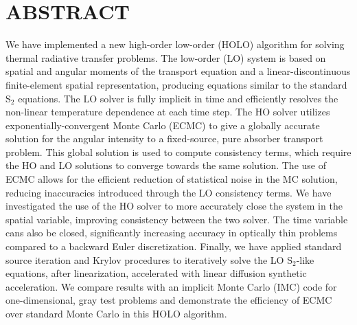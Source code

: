 %
%
%

\chapter*{ABSTRACT}

\pagestyle{plain} %
\setcounter{page}{2}

\indent 
We have implemented a new high-order low-order (HOLO) algorithm for solving
thermal radiative transfer problems.  The low-order (LO) system is based on spatial
and angular moments of the transport equation and a linear-discontinuous
finite-element spatial representation, producing equations similar to the standard
S$_2$ equations.  
The LO solver is fully implicit in time and efficiently resolves the non-linear
temperature dependence at each time step.   The HO solver
utilizes exponentially-convergent Monte Carlo (ECMC) to give a globally accurate solution
for the angular intensity to a fixed-source, pure absorber transport problem.  This
global solution is used to compute consistency terms, which require the HO and LO solutions to converge towards the same solution. 
The use of ECMC
allows for the efficient reduction of statistical noise in the MC solution, reducing
inaccuracies introduced through the LO consistency
terms. We have investigated the use of the HO solver to more accurately close the system in the
spatial variable, improving consistency between the two solver.  The time variable cans also be closed, significantly increasing
accuracy in optically thin problems compared to a backward Euler discretization. 
Finally, we have applied standard source iteration and Krylov procedures to iteratively solve the LO
S$_2$-like equations, after linearization, accelerated with linear diffusion synthetic
acceleration.
We compare results with an
implicit Monte Carlo (IMC) code for one-dimensional, gray test problems and 
demonstrate the efficiency of ECMC over standard Monte Carlo in this HOLO algorithm.

\pagebreak{}
